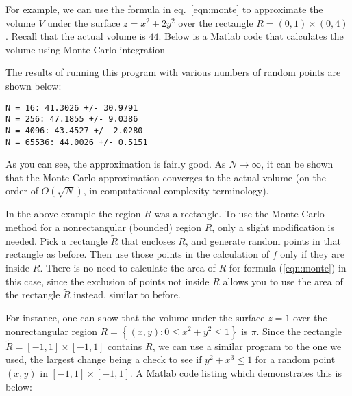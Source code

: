 For example, we can use the formula in eq.\ \eqref{eqn:monte} to approximate the volume $V$ under the surface $z=x^2+2y^2$ over the
rectangle $R =(0,1)\times(0,4)$. Recall that the actual volume is $44$. Below is a  Matlab code  that calculates the volume using Monte Carlo integration



The results of running this program with various numbers of random points are shown below:
\begin{verbatim}
N = 16: 41.3026 +/- 30.9791
N = 256: 47.1855 +/- 9.0386
N = 4096: 43.4527 +/- 2.0280
N = 65536: 44.0026 +/- 0.5151
\end{verbatim}

As you can see, the approximation is fairly good. As $N \to \infty$, it can be shown that the Monte Carlo approximation converges to the actual volume (on the order of $O(\sqrt{N})$, in computational complexity terminology).

In the above example the region $R$ was a rectangle. To use the Monte Carlo method for a nonrectangular
(bounded) region $R$, only a slight modification is needed. Pick a rectangle $\tilde{R}$ that encloses $R$, and
generate random points in that rectangle as before. Then use those points in the calculation of $\bar{f}$ only if they are inside
$R$. There is no need to calculate the area of $R$ for formula (\ref{eqn:monte}) in this case, since the exclusion of
points not inside $R$ allows you to use the area of the rectangle $\tilde{R}$ instead, similar to before.

For instance, one can show that the volume under the surface $z=1$ over the nonrectangular region $R = \left\{ (x,y): 0 \le x^2+y^2 \le 1\right\}$ is $\pi$. Since the rectangle $\tilde{R} = [-1,1] \times [ -1,1]$ contains $R$, we can use a similar program to the one we used, the largest change being a check to see if $y^2+x^3 \leq 1$ for a random point $(x,y)$ in $[-1,1] \times [ -1,1]$. A Matlab code listing which demonstrates this is below:



